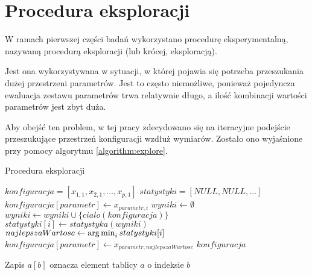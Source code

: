\documentclass[./FM_mgr.tex]{subfiles}
\begin{document}
\section{Procedura eksploracji} \label{appendix:explore}

W ramach pierwszej części badań wykorzystano procedurę eksperymentalną, nazywaną procedurą eksploracji (lub krócej, eksploracją).

Jest ona wykorzystywana w sytuacji, w której pojawia się potrzeba przeszukania dużej przestrzeni parametrów.
Jest to często niemożliwe, ponieważ pojedyncza ewaluacja zestawu parametrów trwa relatywnie długo, a ilość kombinacji wartości parametrów jest zbyt duża.

Aby obejść ten problem, w tej pracy zdecydowano się na iteracyjne podejście przeszukujące przestrzeń konfiguracji wzdłuż wymiarów.
Zostało ono wyjaśnione przy pomocy algorytmu \ref{algorithm:explore}.

\clearpage

\begin{algorithm}[H]
	\caption{Procedura eksploracji \label{algorithm:explore}}
	\begin{algorithmic}[1]
		\Start
		\Var $konfiguracja = [x_{1, 1}, x_{2, 1}, \ldots, x_{p, 1}]$
		\Var $statystyki = [NULL, NULL, \ldots]$ 
		\State $konfiguracja[parametr] \gets x_{parametr, i}$ 
		\Var $wyniki \gets \emptyset$
		\State $wyniki \gets wyniki \cup \{ cialo(konfiguracja) \}$
		\EndFor
		\State $statystyki[i] \gets statystyka(wyniki)$
		\EndFor
		\Var $najlepszaWartosc \gets \operatorname*{arg\,min}_{i} statystyki[i]$
		\State $konfiguracja[parametr] \gets x_{parametr, najlepszaWartosc}$
		\EndFor
		\EndFor
		\State \Return $konfiguracja$
		\EndOperator
	\end{algorithmic}
	Zapis $a[b]$ oznacza element tablicy $a$ o indeksie $b$
\end{algorithm}
\end{document}
